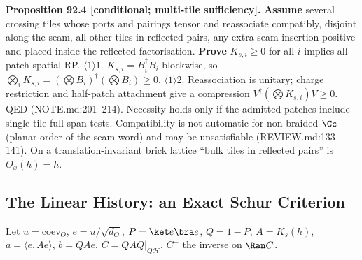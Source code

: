 \textbf{Proposition 92.4 [conditional; multi-tile sufficiency].}  \textbf{Assume} several crossing tiles whose ports
and pairings tensor and reassociate compatibly, disjoint along the seam, all other tiles in reflected pairs, any extra
seam insertion positive and placed inside the reflected factorisation.  \textbf{Prove} \(K_{s,i}\ge0\) for all \(i\)
implies all-patch spatial RP.  \(\langle1\rangle1\). \(K_{s,i}=B_i^\dagger B_i\) blockwise, so \(\bigotimes_iK_{s,i}=
(\bigotimes B_i)^\dagger(\bigotimes B_i)\ge0\).  \(\langle1\rangle2\). Reassociation is unitary; charge restriction and
half-patch attachment give a compression \(V^\dagger(\bigotimes K_{s,i})V\ge0\).  QED (NOTE.md:201--214).
Necessity holds only if the admitted patches include single-tile full-span tests.  Compatibility is not automatic
for non-braided \(\Cc\) (planar order of the seam word) and may be unsatisfiable (REVIEW.md:133--141).  On a
translation-invariant brick lattice ``bulk tiles in reflected pairs'' is \(\Theta_x(h)=h\).

\subsection{The Linear History: an Exact Schur Criterion}

Let \(u=\mathrm{coev}_O\), \(e=u/\sqrt{d_O}\), \(P=\ket e\bra e\), \(Q=1-P\), \(A=K_s(h)\), \(a=\langle e,Ae\rangle\),
\(b=QAe\), \(C=QAQ|_{Q\mathcal H}\), \(C^+\) the inverse on \(\Ran C\).

